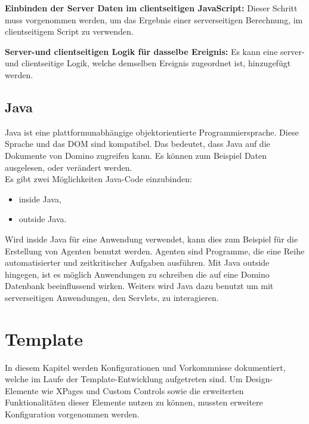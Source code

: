 \textbf{Einbinden der Server Daten im clientseitigen JavaScript: } Dieser Schritt muss vorgenommen werden, um das Ergebnis einer serverseitigen Berechnung,
 im clientseitigem Script zu verwenden.\newline
 \newline



\textbf{Server-und clientseitigen Logik für dasselbe Ereignis: } Es kann eine server- und clientseitige Logik, welche demselben Ereignis
zugeordnet ist, hinzugefügt werden.


\subsection{Java}
\label{sec:4designelemente}

Java ist eine plattformunabhängige objektorientierte Programmiersprache. Diese Sprache und das DOM sind kompatibel.
Das bedeutet, dass Java auf die Dokumente von Domino zugreifen kann. Es können zum Beispiel Daten ausgelesen, oder verändert werden.\\
\newline
Es gibt zwei Möglichkeiten Java-Code einzubinden:
\begin{itemize}
\item inside Java,
\item outside Java.
\end{itemize} 

\par Wird inside Java für eine Anwendung verwendet, kann dies zum Beispiel für die Erstellung von Agenten benutzt werden. Agenten sind Programme, die
eine Reihe automatisierter und zeitkritischer Aufgaben ausführen\cite{ebel}.
Mit Java outside hingegen, ist es möglich Anwendungen zu schreiben die auf eine Domino Datenbank beeinflussend wirken. 
Weiters wird Java dazu benutzt um mit serverseitigen Anwendungen, den Servlets, zu interagieren\cite{mccoy}. 



\section{Template}

In diesem Kapitel werden Konfigurationen und Vorkommnisse dokumentiert, welche im \linebreak Laufe der Template-Entwicklung aufgetreten sind. 
Um Design-Elemente wie XPages \linebreak und Custom Controls sowie die erweiterten Funktionalitäten dieser Elemente nutzen zu können, mussten
erweitere Konfiguration vorgenommen werden. 

